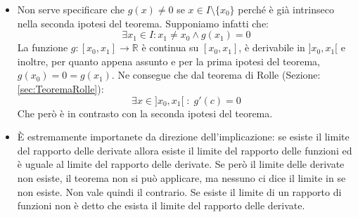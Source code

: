 \begin{itemize}
	\item Non serve specificare che $g(x) \neq 0$ se $x \in I\setminus \{x_0\}$ perché è già intrinseco nella seconda ipotesi del teorema. Supponiamo infatti che:
		\begin{equation*}
			\exists x_1 \in I : x_1 \neq x_0 \land g(x_1) = 0
		\end{equation*}
		La funzione $g:[x_0, x_1] \to \mathbb{R}$ è continua su $[x_0, x_1]$, è derivabile in $]x_0,x_1[$ e inoltre, per quanto appena assunto e per la prima ipotesi del teorema, $g(x_0) = 0 = g(x_1)$. Ne consegue che dal teorema di Rolle (Sezione: \ref{sec:TeoremaRolle}):
		\begin{equation*}
			\exists x \in ]x_0, x_1[ \; : \; g'(c) = 0
		\end{equation*}
		Che però è in contrasto con la seconda ipotesi del teorema.

	\item È estremamente importanete da direzione dell'implicazione: se esiste il limite del rapporto delle derivate allora esiste il limite del rapporto delle funzioni ed è uguale al limite del rapporto delle derivate. Se però il limite delle derivate non esiste, il teorema non si può applicare, ma nessuno ci dice il limite in se non esiste. Non vale quindi il contrario. Se esiste il limite di un rapporto di funzioni non è detto che esista il limite del rapporto delle derivate. %


\end{itemize}
